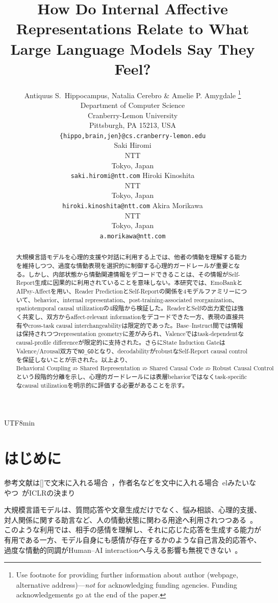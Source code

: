\documentclass{article} %
\title{How Do Internal Affective Representations Relate to What Large Language Models Say They Feel?}
\author{Antiquus S.~Hippocampus, Natalia Cerebro \& Amelie P. Amygdale \thanks{ Use footnote for providing further information
about author (webpage, alternative address)---\emph{not} for acknowledging
funding agencies.  Funding acknowledgements go at the end of the paper.} \\
Department of Computer Science\\
Cranberry-Lemon University\\
Pittsburgh, PA 15213, USA \\
\texttt{\{hippo,brain,jen\}@cs.cranberry-lemon.edu} \\
\And
  Saki Hiromi \\
  NTT \\
  Tokyo, Japan \\
  \texttt{saki.hiromi@ntt.com}
  \And
  Hiroki Kinoshita \\
  NTT \\
  Tokyo, Japan \\
  \texttt{hiroki.kinoshita@ntt.com}
  \And
  Akira Morikawa \\
  NTT \\
  Tokyo, Japan \\
  \texttt{a.morikawa@ntt.com}
}
\begin{document}
\begin{CJK*}{UTF8}{min}

\maketitle

\begin{abstract}
大規模言語モデルを心理的支援や対話に利用する上では、他者の情動を理解する能力を維持しつつ、過度な情動表現を選択的に制御する心理的ガードレールが重要となる。しかし、内部状態から情動関連情報をデコードできることは、その情報がSelf-Report生成に因果的に利用されていることを意味しない。本研究では、EmoBankとAIPsy-Affectを用い、Reader PredictionとSelf-Reportの関係を4モデルファミリーについて、behavior、internal representation、post-training-associated reorganization、spatiotemporal causal utilizationの4段階から検証した。ReaderとSelfの出力変位は強く共変し、双方からaffect-relevant informationをデコードできた一方、表現の直接共有やcross-task causal interchangeabilityは限定的であった。Base--Instruct間では情報は保持されつつrepresentation geometryに差がみられ、Valenceではtask-dependentなcausal-profile differenceが限定的に支持された。さらにState Induction GateはValence/Arousal双方で\texttt{NO\_GO}となり、decodabilityがrobustなSelf-Report causal controlを保証しないことが示された。以上より、\(\text{Behavioral Coupling}\not\Rightarrow\text{Shared Representation}\not\Rightarrow\text{Shared Causal Code}\not\Rightarrow\text{Robust Causal Control}\)という段階的分離を示し、心理的ガードレールには表層behaviorではなくtask-specificなcausal utilizationを明示的に評価する必要があることを示す。
\end{abstract}


\section{はじめに}
\label{sec:introduction}
\color{red}
参考文献は[]で文末に入れる場合~\citep{}，作者名などを文中に入れる場合~elみたいなやつ~\citet{}がICLRの決まり
\color{black}

大規模言語モデルは、質問応答や文章生成だけでなく、悩み相談、心理的支援、対人関係に関する助言など、人の情動状態に関わる用途へ利用されつつある~\citep{li2023systematic,luo2025seeking}。このような利用では、相手の感情を理解し、それに応じた応答を生成する能力が有用である一方、モデル自身にも感情が存在するかのような自己言及的応答や、過度な情動的同調がHuman--AI interactionへ与える影響も無視できない~\citep{weidinger2022taxonomy,laestadius2024too,fang2025ai}。


\end{CJK*}
\end{document}
